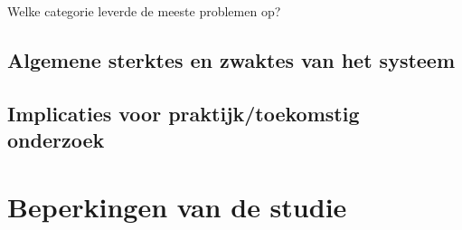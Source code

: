 Welke categorie leverde de meeste problemen op?

\subsection{Algemene sterktes en zwaktes van het systeem}


\subsection{Implicaties voor praktijk/toekomstig onderzoek}


\section{Beperkingen van de studie}
